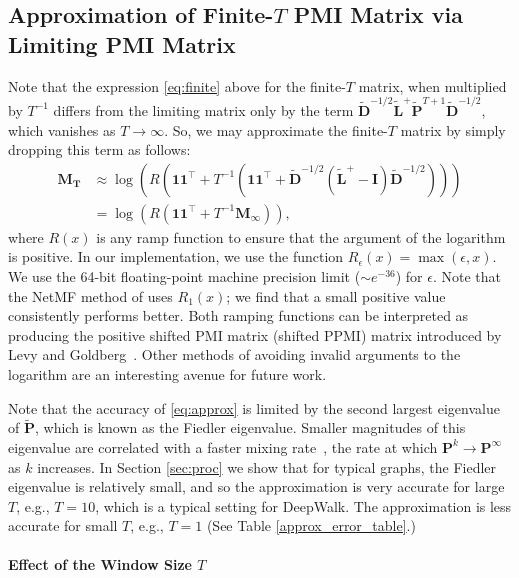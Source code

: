 \documentclass[sigconf]{acmart}
\newcommand{\mbf}[1]{\mathbf{#1}}
\newcommand{\bv}[1]{\mathbf{#1}}
\begin{document}
\subsection{Approximation of Finite-$T$ PMI Matrix via Limiting PMI Matrix}\label{sec:infinite}
Note that the expression \eqref{eq:finite} above for the finite-$T$ matrix, when multiplied by $T^{-1}$ differs from the limiting matrix only by the term $\mbf{\tilde{D}}^{-1/2} \mbf{\tilde{L}}^+ \mbf{\tilde{P}}^{T+1} \mbf{\tilde{D}}^{-1/2}$, which vanishes as $T \to \infty$.
So, we may approximate the finite-$T$ matrix by simply dropping this term as follows:
%
\begin{align}\label{eq:approx}
    \mbf{M_T} 
    &\approx \log\left( R \left( \mbf{1}\mbf{1}^\top + T^{-1} \left( \mbf{1}\mbf{1}^\top + \mbf{\tilde{D}}^{-1/2} \left( \mbf{\tilde{L}}^+ - \mbf{I} \right) \mbf{\tilde{D}}^{-1/2} \right) \right) \right) \nonumber\\
    &= \log\left( R \left( \mbf{1}\mbf{1}^\top + T^{-1} \bv{M_\infty} \right) \right) ,
\end{align}
%
where $R(x)$ is any ramp function to ensure that the argument of the logarithm is positive. In our implementation, we use the function $R_\epsilon(x) = \max(\epsilon, x)$. We use the 64-bit floating-point machine precision limit ($\sim e^{-36}$) for $\epsilon$. Note that the NetMF method of \cite{qiu2018network} uses $R_1(x)$; we find that a small positive value consistently performs better. Both ramping functions can be interpreted as producing the positive shifted PMI matrix (shifted PPMI) matrix introduced by Levy and Goldberg~\cite{levy2014neural}. Other methods of avoiding invalid arguments to the logarithm are an interesting avenue for future work.

Note that the accuracy of \eqref{eq:approx}  is limited by the second largest eigenvalue of $\mbf{\tilde{P}}$, which is known as the Fiedler eigenvalue. Smaller magnitudes of this eigenvalue are correlated with a faster mixing rate~\cite{levinsoneigenvalue}, the rate at which $\mbf{P}^k \to \mbf{P}^\infty$ as $k$ increases. In Section \ref{sec:proc} we show that for typical graphs, the Fiedler eigenvalue is relatively small, and so the approximation is very accurate for large $T$, e.g., $T = 10$, which is a typical setting for DeepWalk. The approximation is less accurate for small $T$, e.g., $T = 1$ (See Table \ref{approx_error_table}.)

\paragraph{Effect of the Window Size $T$}
\end{document}
